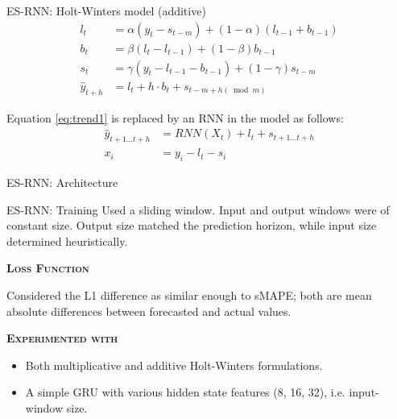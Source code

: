\documentclass[aspectratio=169, 12pt]{beamer}
\begin{document}
\begin{frame}{ES-RNN: Holt-Winters model (additive)}
\begin{align}
    l_t &= \alpha (y_t - s_{t-m}) + (1 - \alpha) (l_{t-1} + b_{t-1}) \label{eq:level1}\\
    b_t &= \beta (l_t - l_{t-1}) + (1- \beta) b_{t-1} \label{eq:trend1}\\ 
    s_t &= \gamma (y_t - l_{t-1} - b_{t-1}) + (1-\gamma) s_{t-m} \label{eq:season1}\\
    \hat{y}_{t+h} &= l_t + h \cdot b_t + s_{t-m+h (\bmod m)} \label{eq:predEq1}
\end{align}

Equation \ref{eq:trend1} is replaced by an RNN in the model as follows:
\begin{align}
    \hat{y}_{t+1 \dots t+h} &= RNN(X_t) + l_t + s_{t+1 \dots t+h} \label{eq:modifiedEq1}\\
    x_i &= y_i - l_t - s_i \label{eq:x1}
\end{align}

\end{frame}

\begin{frame}[fragile]{ES-RNN: Architecture}
    \begin{figure}[htbp]
    \centering
    \def\svgwidth{\columnwidth}
    
    \end{figure}
\end{frame}

\begin{frame}{ES-RNN: Training}
Used a sliding window. Input and output windows were of constant size. Output size matched the prediction horizon, while input size determined heuristically.
\begin{center}
    \textsc{\textbf{Loss Function}}
\end{center}
Considered the L1 difference as similar enough to sMAPE; both are mean absolute differences between forecasted and actual values.
\begin{center}
    \textsc{\textbf{Experimented with}}
\end{center}
    \begin{itemize}
        \item Both multiplicative and additive Holt-Winters formulations.
        \item A simple GRU with various hidden state features (8, 16, 32), i.e. input-window size.
    \end{itemize}
\end{frame}
\end{document}
